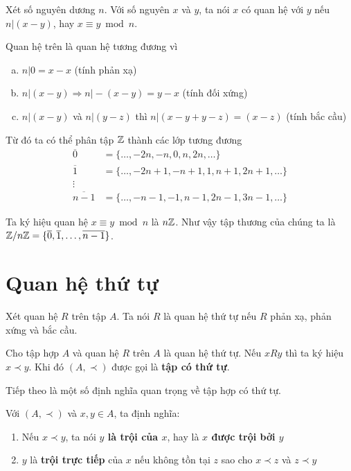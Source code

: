 \begin{example}
    Xét số nguyên dương $n$. Với số nguyên $x$ và $y$, ta nói $x$ có quan
    hệ với $y$ nếu $n \vert (x - y)$, hay $x \equiv y \bmod n$.

    Quan hệ trên là quan hệ tương đương vì
    \begin{enumerate}[a)]
        \item $n \vert 0 = x - x$ (tính phản xạ)
        \item $n \vert (x - y) \Rightarrow n \vert -(x-y) = y-x$ (tính đối xứng)
        \item $n \vert (x - y)$ và $n \vert (y - z)$ thì $n \vert (x - y + y - z)
        = (x - z)$ (tính bắc cầu)
    \end{enumerate}
    Từ đó ta có thể phân tập $\mathbb{Z}$ thành các lớp tương đương
    \begin{align*}
        \overline{0} & = \{ \ldots, -2n, -n, 0, n, 2n, \ldots \} \\
        \overline{1} & = \{ \ldots, -2n+1, -n+1, 1, n+1, 2n+1, \ldots \} \\
        \vdots \\
        \overline{n-1} & = \{ \ldots, -n-1, -1, n-1, 2n-1, 3n-1, \ldots \}
    \end{align*}

    Ta ký hiệu quan hệ $x \equiv y \bmod n$ là $n \mathbb{Z}$. Như vậy tập thương
    của chúng ta là $\mathbb{Z} / n\mathbb{Z} = \{ \overline{0}, \overline{1}, \ldots, 
    \overline{n-1} \}$.
\end{example}

\section{Quan hệ thứ tự}

\begin{definition}
    Xét quan hệ $R$ trên tập $A$. Ta nói $R$ là quan hệ thứ tự nếu $R$ phản xạ, 
    phản xứng và bắc cầu.
\end{definition}

\begin{definition}
    Cho tập hợp $A$ và quan hệ $R$ trên $A$ là quan hệ thứ tự. Nếu $x R y$ thì
    ta ký hiệu $x \prec y$. Khi đó $(A, \prec)$ được gọi là \textbf{tập có 
    thứ tự}.
\end{definition}

Tiếp theo là một số định nghĩa quan trọng về tập hợp có thứ tự.

\begin{definition}
    Với $(A, \prec)$ và $x, y \in A$, ta định nghĩa:
    \begin{enumerate}
        \item Nếu $x \prec y$, ta nói \textbf{$y$ là trội của $x$}, hay là
        \textbf{$x$ được trội bởi $y$}
        \item $y$ là \textbf{trội trực tiếp} của $x$ nếu không tồn tại $z$ sao
        cho $x \prec z$ và $z \prec y$
    \end{enumerate}
\end{definition}

